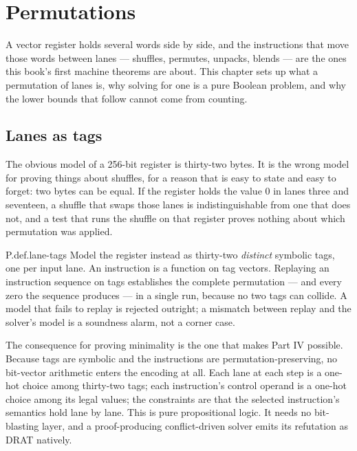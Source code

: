 \chapter{Permutations}
\label{ch:permutations}

A vector register holds several words side by side, and the instructions that move those words between lanes --- shuffles, permutes, unpacks, blends --- are the ones this book's first machine theorems are about. This chapter sets up what a permutation of lanes is, why solving for one is a pure Boolean problem, and why the lower bounds that follow cannot come from counting.

\section{Lanes as tags}
\label{sec:tags}

The obvious model of a 256-bit register is thirty-two bytes. It is the wrong model for proving things about shuffles, for a reason that is easy to state and easy to forget: two bytes can be equal. If the register holds the value \(0\) in lanes three and seventeen, a shuffle that swaps those lanes is indistinguishable from one that does not, and a test that runs the shuffle on that register proves nothing about which permutation was applied.

\begin{artifact}{P.def.lane-tags}
Model the register instead as thirty-two \emph{distinct} symbolic tags, one per input lane. An instruction is a function on tag vectors. Replaying an instruction sequence on tags establishes the complete permutation --- and every zero the sequence produces --- in a single run, because no two tags can collide. A model that fails to replay is rejected outright; a mismatch between replay and the solver's model is a soundness alarm, not a corner case.
\end{artifact}

The consequence for proving minimality is the one that makes Part IV possible. Because tags are symbolic and the instructions are permutation-preserving, no bit-vector arithmetic enters the encoding at all. Each lane at each step is a one-hot choice among thirty-two tags; each instruction's control operand is a one-hot choice among its legal values; the constraints are that the selected instruction's semantics hold lane by lane. This is pure propositional logic. It needs no bit-blasting layer, and a proof-producing conflict-driven solver emits its refutation as DRAT natively.

